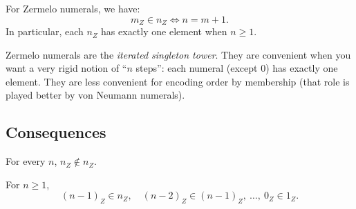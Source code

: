 \begin{proposition}
\label{prop:zermelo-membership}
For Zermelo numerals, we have:
\[
m_Z \in n_Z \iff n = m+1.
\]
In particular, each $n_Z$ has exactly one element when $n\ge 1$.
\end{proposition}



\begin{remark}
Zermelo numerals are the \emph{iterated singleton tower}.
They are convenient when you want a very rigid notion of ``$n$ steps'':
each numeral (except $0$) has exactly one element.
They are less convenient for encoding order by membership (that role is played better by von Neumann numerals).
\end{remark}

\subsection{Consequences}

\begin{corollary}
\label{cor:zermelo-no-self-membership}
For every $n$, $n_Z \notin n_Z$.
\end{corollary}



\begin{corollary}
\label{cor:zermelo-chain}
For $n\ge 1$,
\[
(n-1)_Z \in n_Z,\quad (n-2)_Z \in (n-1)_Z,\ \dots,\ 0_Z \in 1_Z.
\]
\end{corollary}


